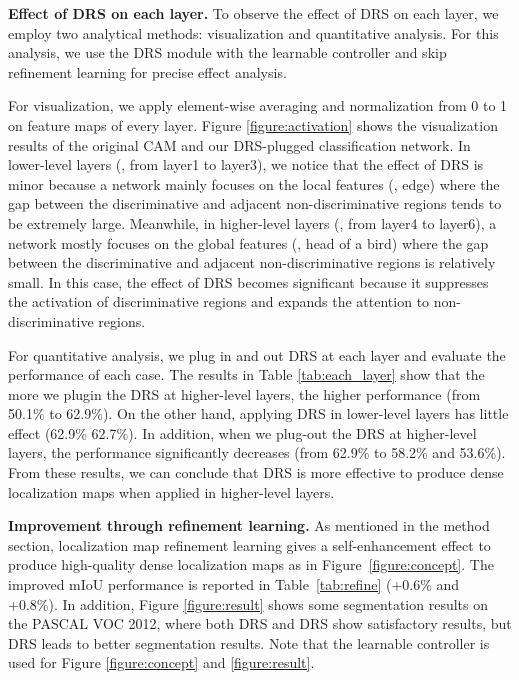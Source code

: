 \documentclass[letterpaper]{article} \usepackage{aaai21}  \usepackage{times}  \usepackage{helvet} \usepackage{courier}  \usepackage[hyphens]{url}  \usepackage{graphicx} \urlstyle{rm} \def\UrlFont{\rm}  \usepackage{natbib}  \usepackage{caption} \frenchspacing  \setlength{\pdfpagewidth}{8.5in}  \setlength{\pdfpageheight}{11in}
\begin{document}
\noindent\textbf{Effect of DRS on each layer.}
To observe the effect of DRS on each layer, we employ two analytical methods: visualization and quantitative analysis.
For this analysis, we use the DRS module with the learnable controller and skip refinement learning for precise effect analysis. 

For visualization, we apply element-wise averaging and normalization from 0 to 1 on feature maps of every layer. Figure \ref{figure:activation} shows the visualization results of the original CAM and our DRS-plugged classification network.
In lower-level layers (, from layer1 to layer3), we notice that the effect of DRS is minor because a network mainly focuses on the local features (, edge) where the gap between the discriminative and adjacent non-discriminative regions tends to be extremely large.
Meanwhile, in higher-level layers (, from layer4 to layer6), a network mostly focuses on the global features (, head of a bird) where the gap between the discriminative and adjacent non-discriminative regions is relatively small.
In this case, the effect of DRS becomes significant because it suppresses the activation of discriminative regions and expands the attention to non-discriminative regions.

For quantitative analysis, we plug in and out DRS at each layer and evaluate the performance of each case.
The results in Table \ref{tab:each_layer} show that the more we plugin the DRS at higher-level layers, the higher performance (from 50.1\% to 62.9\%).
On the other hand, applying DRS in lower-level layers has little effect (62.9\%  62.7\%).
In addition, when we plug-out the DRS at higher-level layers, the performance significantly decreases (from 62.9\% to 58.2\% and 53.6\%).
From these results, we can conclude that DRS is more effective to produce dense localization maps when applied in higher-level layers.

\noindent\textbf{Improvement through refinement learning.}
As mentioned in the method section, localization map refinement learning gives a self-enhancement effect to produce high-quality dense localization maps as in Figure~\ref{figure:concept}. 
The improved mIoU performance is reported in Table~\ref{tab:refine} (+0.6\% and +0.8\%).
In addition, Figure \ref{figure:result} shows some segmentation results on the PASCAL VOC 2012, where both DRS and DRS show satisfactory results, but DRS leads to better segmentation results. 
Note that the learnable controller is used for Figure \ref{figure:concept} and \ref{figure:result}.
\end{document}
